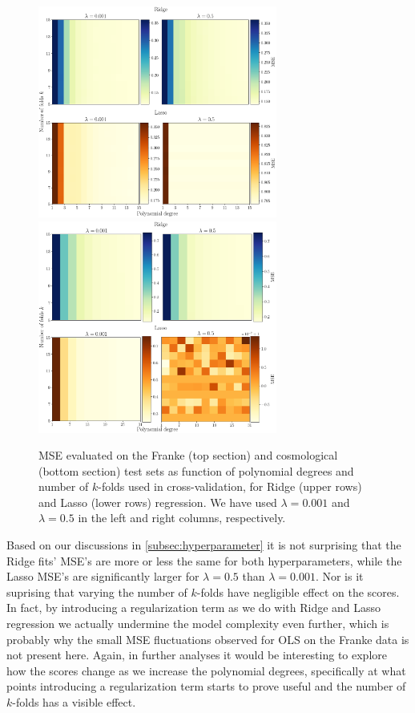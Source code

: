 \documentclass[aps,pra,english,notitlepage,reprint,nofootinbib]{revtex4-1}  %
\begin{document}
\begin{figure}
  \vspace*{-5pt}
  \centering %
  \includegraphics[width=0.7\textwidth]{../figs/f_Ridge_Lasso.pdf}
  \centering
  \includegraphics[width=0.7\textwidth]{../figs/g_Ridge_Lasso.pdf}
  \caption{MSE evaluated on the Franke (top section) and cosmological (bottom section) test sets as function of polynomial degrees and number of $k$-folds used in cross-validation, for Ridge (upper rows) and Lasso (lower rows) regression. We have used $\lambda=0.001$ and $\lambda=0.5$ in the left and right columns, respectively.}\label{fig:kfold Ridge Lasso}
  \vspace*{-5pt}
\end{figure}

Based on our discussions in \cref{subsec:hyperparameter} it is not surprising that the Ridge fits' MSE's are more or less the same for both hyperparameters, while the Lasso MSE's are significantly larger for $\lambda=0.5$ than $\lambda=0.001$. Nor is it suprising that varying the number of $k$-folds have negligible effect on the scores. In fact, by introducing a regularization term as we do with Ridge and Lasso regression we actually undermine the model complexity even further, which is probably why the small MSE fluctuations observed for OLS on the Franke data is not present here. Again, in further analyses it would be interesting to explore how the scores change as we increase the polynomial degrees, specifically at what points introducing a regularization term starts to prove useful and the number of $k$-folds has a visible effect.
\end{document}
